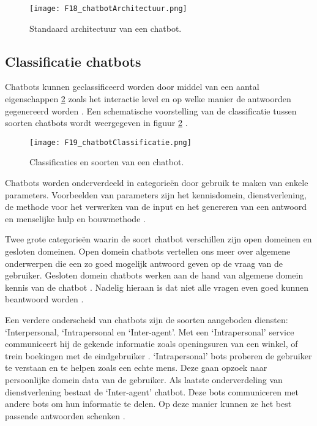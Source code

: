 \begin{figure}[h]
    \centering
    \texttt{[image: F18\_chatbotArchitectuur.png]}
    \captionsetup{justification=ce/brntering, singlelinecheck=false}    
    \caption{Standaard architectuur van een chatbot.}
    \label{fig:chatbotArchitectuur}
\end{figure}

\subsection{Classificatie chatbots}%
\label{sec:chatbotTypes}

Chatbots kunnen geclassificeerd worden door middel van een aantal eigenschappen \ref{fig:chatbotTypes} zoals het interactie level en op welke manier de antwoorden gegenereerd worden \autocite{Nimavat2017}.
Een schematische voorstelling van de classificatie tussen soorten chatbots wordt weergegeven in figuur \ref{fig:chatbotTypes} \autocite{Tamrakar2021}.


\begin{figure}[h]
    \centering
    \texttt{[image: F19\_chatbotClassificatie.png]}
    \captionsetup{justification=ce/brntering, singlelinecheck=false}    
    \caption{Classificaties en soorten van een chatbot.}
    \label{fig:chatbotTypes}
\end{figure}

Chatbots worden onderverdeeld in categorieën door gebruik te maken van enkele parameters. Voorbeelden van parameters zijn het kennisdomein, dienstverlening, de methode voor het verwerken van de input en het genereren van een antwoord en menselijke hulp en bouwmethode \autocite{Adamopoulou2020}. 

Twee grote categorieën waarin de soort chatbot verschillen zijn open domeinen en gesloten domeinen. Open domein chatbots vertellen ons meer over algemene onderwerpen die een zo goed mogelijk antwoord geven op de vraag van de gebruiker. Gesloten domein chatbots werken aan de hand van algemene domein kennis van de chatbot \autocite{Adamopoulou2020}. Nadelig hieraan is dat niet alle vragen even goed kunnen beantwoord worden \autocite{Kucherbaev2018}.

Een verdere onderscheid van chatbots zijn de soorten aangeboden diensten: ‘Interpersonal, ‘Intrapersonal en ‘Inter-agent’. Met een ‘Intrapersonal’ service communiceert hij de gekende informatie zoals openingsuren van een winkel, of trein boekingen met de eindgebruiker \autocite{Adamopoulou2020}. ‘Intrapersonal’ bots proberen de gebruiker te verstaan en te helpen zoals een echte mens. Deze gaan opzoek naar persoonlijke domein data van de gebruiker. Als laatste onderverdeling van dienstverlening bestaat de ‘Inter-agent’ chatbot. Deze bots communiceren met andere bots om hun informatie te delen. Op deze manier kunnen ze het best passende antwoorden schenken \autocite{Nimavat2017}.

